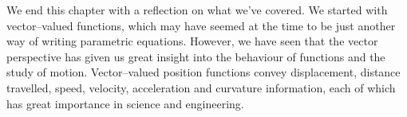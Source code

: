 We end this chapter with a reflection on what we've covered. We started with vector--valued functions, which may have seemed at the time to be just another way of writing parametric equations. However, we have seen that the vector perspective has given us great insight into the behaviour of functions and the study of motion. Vector--valued position functions convey displacement, distance travelled, speed, velocity, acceleration and curvature information, each of which has great importance in science and engineering.




